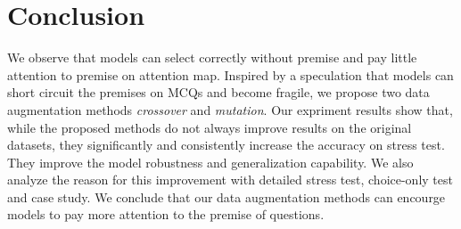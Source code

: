 \section{Conclusion}

We observe that models can select correctly without premise and 
pay little attention to premise on attention map. Inspired by a speculation that 
models can short circuit the premises on MCQs and become fragile, 
we propose two data augmentation methods 
\textit{crossover} and \textit{mutation}. 
Our expriment results show that, while the
proposed methods do not always improve
results on the original datasets,
they significantly and consistently increase the
accuracy on stress test. 
They improve the model robustness and generalization capability. 
We also analyze the reason for this improvement 
with detailed stress test, choice-only test and 
case study. We conclude that our data augmentation methods can encourge models to pay more 
attention to the premise of questions. 

